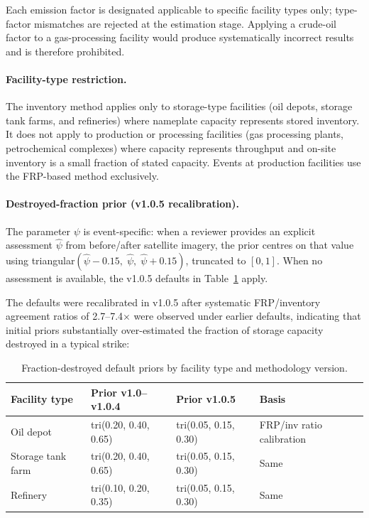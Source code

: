 \documentclass[11pt]{article}
\begin{document}
Each emission factor is designated applicable to specific facility types
only; type-factor mismatches are rejected at the estimation stage. Applying
a crude-oil factor to a gas-processing facility would produce
systematically incorrect results and is therefore prohibited.

\paragraph{Facility-type restriction.}
The inventory method applies only to storage-type facilities
(oil depots, storage tank farms, and refineries) where nameplate capacity
represents stored inventory. It does not apply to production or processing
facilities (gas processing plants, petrochemical complexes) where capacity
represents throughput and on-site inventory is a small fraction of stated
capacity. Events at production facilities use the FRP-based method
exclusively.

\paragraph{Destroyed-fraction prior (v1.0.5 recalibration).}
The parameter $\psi$ is event-specific: when a reviewer provides an
explicit assessment $\hat\psi$ from before/after satellite imagery, the
prior centres on that value using triangular$(\hat\psi - 0.15,\;
\hat\psi,\; \hat\psi + 0.15)$, truncated to $[0,1]$. When no assessment
is available, the v1.0.5 defaults in Table~\ref{tab:psi} apply.

The defaults were recalibrated in v1.0.5 after systematic FRP/inventory
agreement ratios of 2.7--7.4$\times$ were observed under earlier defaults,
indicating that initial priors substantially over-estimated the fraction of
storage capacity destroyed in a typical strike:

\begin{table}[h]
\centering
\caption{Fraction-destroyed default priors by facility type and
  methodology version.}
\label{tab:psi}
\begin{tabular}{@{}llll@{}}
\toprule
\textbf{Facility type} & \textbf{Prior v1.0--v1.0.4}
  & \textbf{Prior v1.0.5} & \textbf{Basis} \\
\midrule
Oil depot             & tri(0.20, 0.40, 0.65)
  & tri(0.05, 0.15, 0.30) & FRP/inv ratio calibration \\
Storage tank farm     & tri(0.20, 0.40, 0.65)
  & tri(0.05, 0.15, 0.30) & Same \\
Refinery              & tri(0.10, 0.20, 0.35)
  & tri(0.05, 0.15, 0.30) & Same \\
\bottomrule
\end{tabular}
\end{table}
\end{document}
